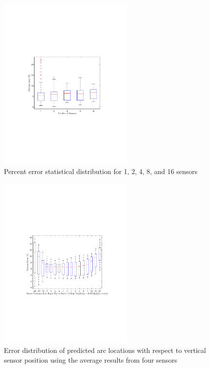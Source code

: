 \documentclass[onehalf,11pt]{beavtex}
\begin{document}
\begin{figure}[htbp]
\centering
	\includegraphics[width=0.6\textwidth]{num_sens_opt_error.pdf}
	\caption{Percent error statistical distribution for 1, 2, 4, 8, and 16 sensors}
	\label{fig:numsens}
\end{figure}

\begin{figure}[htbp]
\centering
	\includegraphics[width=0.6\textwidth]{four_sensor_sens_height.pdf}
	\caption{Error distribution of predicted arc locations with respect to vertical sensor position using the average results from four sensors}
	\label{fig:fourheight}
\end{figure}
\end{document}
